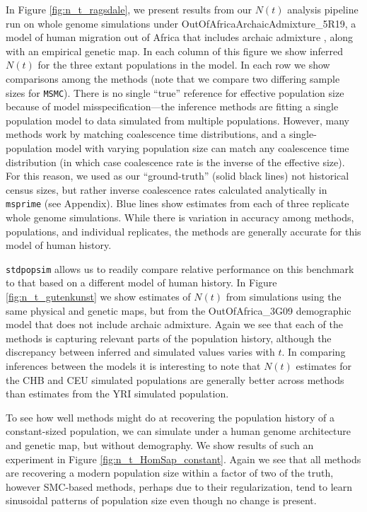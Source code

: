 \documentclass[12pt,halfline,a4paper]{ouparticle}
\newcommand{\stdpopsim}{\texttt{stdpopsim}\xspace}
\newcommand{\MSMC}{\texttt{MSMC}\xspace}
\begin{document}
In Figure \ref{fig:n_t_ragsdale}, we present results from our $N(t)$ analysis pipeline
run on whole genome simulations under OutOfAfricaArchaicAdmixture\_5R19,
a model of human migration out of Africa that includes archaic admixture 
\citep{ragsdale2019models}, along with an empirical genetic map. In each column of this figure
we show inferred $N(t)$ for the three extant populations in the model.
In each row we show comparisons among the methods (note that we compare two differing
sample sizes for \MSMC).
There is no single ``true'' reference for effective population size
because of model misspecification---the inference methods are fitting a single population model
to data simulated from multiple populations.  
However, many methods work by matching coalescence time distributions,
and a single-population model with varying population size can match any coalescence time distribution
(in which case coalescence rate is the inverse of the effective size).
For this reason, we used as our ``ground-truth'' (solid black lines) 
not historical census sizes,
but rather inverse coalescence rates calculated analytically in \texttt{msprime} (see Appendix).
Blue lines show estimates from each of three replicate whole genome simulations.
While there is variation in accuracy among methods, populations, and individual replicates,
the methods are generally accurate for this model of human history.

\stdpopsim allows us to readily compare relative performance on this benchmark to
that based on a different
model of human history. In Figure \ref{fig:n_t_gutenkunst} we show estimates of
$N(t)$ from simulations using the same physical and genetic maps, but from the OutOfAfrica\_3G09
demographic model that does not include archaic admixture. Again we see that each
of the methods is capturing relevant parts of the population history, although the
discrepancy between inferred and simulated values varies with $t$. In comparing inferences between the
models it is interesting to note that $N(t)$ estimates for the CHB and CEU
simulated populations are generally better across methods than estimates from the YRI
simulated population.

To see how well methods might do at recovering the population history of a constant-sized population,
we can simulate under a human genome architecture and genetic map, but without demography.
We show results of such an
experiment in Figure \ref{fig:n_t_HomSap_constant}. Again we see that all methods
are recovering a modern population size within a factor of two of the truth, however
SMC-based methods, perhaps due to their regularization, tend to learn sinusoidal
patterns of population size even though no change is present.
\end{document}
